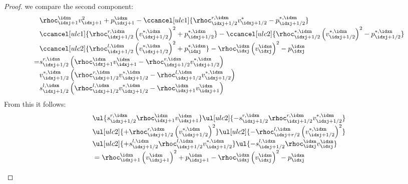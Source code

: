 \begin{proofbox}\nospacing
    \begin{proof}
        we compare the second component:
        \begin{align*}
          &\rhoc_{\idxj+1}^{\idxn}v_{\idxj+1}^{2}+p_{\idxj+1}^{\idxn}-\ccancel[ulc1]{\rhoc_{\idxj+1/2}^{r,\idxn}v_{\idxj+1/2}^{*}-p_{\idxj+1/2}^{*,\idxn}}\\[-1\jot]
          &\ccancel[ulc1]{\rhoc_{\idxj+1/2}^{r,\idxn}\left(v_{\idxj+1/2}^{*,\idxn}\right)^{2}+p_{\idxj+1/2}^{*,\idxn}}-\ccancel[ulc2]{\rhoc_{\idxj+1/2}^{*,\idxn}\left(v_{\idxj+1/2}^{*,\idxn}\right)^{2}-p_{\idxj+1/2}^{*,\idxn}}\\[-1\jot]
          &\ccancel[ulc2]{\rhoc_{\idxj+1/2}^{l,\idxn}\left(v_{\idxj+1/2}^{*,\idxn}\right)^{2}+p_{\idxj}^{*,\idxn}}-\rhoc_{\idxj}^{\idxn}\left(v_{\idxj}^{\idxn}\right)^{2}-p_{\idxj}^{\idxn} \\[-1\jot]
          =&s_{\idxj+1/2}^{r,\idxn}\left(\rhoc_{\idxj+1}^{\idxn}v_{\idxj+1}^{\idxn}-\rhoc_{\idxj+1/2}^{r,\idxn}v_{\idxj+1/2}^{*,\idxn}\right)\\[-1\jot]
            &v_{\idxj+1/2}^{*,\idxn}\left(\rhoc_{\idxj+1/2}^{r,\idxn}v_{\idxj+1/2}^{*,\idxn}-\rhoc_{\idxj+1/2}^{l,\idxn}v_{\idxj+1/2}^{*,\idxn}\right)\\[-1\jot]
            &s_{\idxj+1/2}^{l,\idxn}\left(\rhoc_{\idxj+1/2}^{l,\idxn}v_{\idxj+1/2}^{*,\idxn}-\rhoc_{\idxj+1}^{\idxn}v_{\idxj+1}^{\idxn}\right)
        \end{align*}
        From this it follows:
        \begin{align*}
          &\ul{s_{\idxj+1/2}^{r,\idxn}\rhoc_{\idxj+1}^{\idxn}v_{\idxj+1}^{\idxn}}
          \ul[ulc2]{-s_{\idxj+1/2}^{r,\idxn}\rhoc_{\idxj+1/2}^{r,\idxn}v_{\idxj+1/2}^{*,\idxn}}\\[-1\jot]
          &\ul[ulc2]{+\rhoc_{\idxj+1/2}^{r,\idxn}\left(v_{\idxj+1/2}^{*,\idxn}\right)^{2}}
          \ul[ulc2]{-\rhoc_{\idxj+r/2}^{l,\idxn}\left(v_{\idxj+1/2}^{*,\idxn}\right)^{2}}\\[-1\jot]
          &\ul[ulc2]{+s_{\idxj+1/2}^{l,\idxn}\rhoc_{\idxj+1/2}^{l,\idxn}v_{\idxj+1/2}^{*,\idxn}}
          \ul{-s_{\idxj+1/2}^{l,\idxn}\rhoc_{\idxj}^{\idxn}v_{\idxj}^{\idxn}}\\[-1\jot]
          &=\rhoc_{\idxj+1}^{\idxn}\left(v_{\idxj+1}^{\idxn}\right)^{2}+p_{\idxj+1}^{\idxn}
            -\rhoc_{\idxj}^{\idxn}\left(v_{\idxj}^{\idxn}\right)^{2}-p_{\idxj}^{\idxn}
        \end{align*}
        \begin{align*}

\end{align*}
\end{proof}
\end{proofbox}
